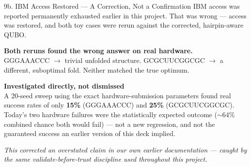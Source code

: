 \documentclass[aspectratio=169,10pt]{beamer}
\begin{document}
\begin{frame}{9b. IBM Access Restored --- A Correction, Not a Confirmation}
  \small IBM access was reported permanently exhausted earlier in this project. That was wrong --- access was restored, and both toy cases were rerun against the corrected, hairpin-aware QUBO.
  \vspace{6pt}
  \begin{redbox}
  \textbf{Both reruns found the wrong answer on real hardware.}\\[4pt]
  \footnotesize GGGAAACCC $\to$ trivial unfolded structure. GCGCUUCGGCGC $\to$ a different, suboptimal fold. Neither matched the true optimum.
  \end{redbox}
  \vspace{8pt}
  \begin{navybox}
  \textbf{\color{accent}Investigated directly, not dismissed}\\[4pt]
  \footnotesize A 20-seed sweep using the exact hardware-submission parameters found real success rates of only \textbf{15\%} (GGGAAACCC) and \textbf{25\%} (GCGCUUCGGCGC). Today's two hardware failures were the statistically expected outcome ($\sim$64\% combined chance both would fail) --- not a new regression, and not the guaranteed success an earlier version of this deck implied.
  \end{navybox}
  \vspace{8pt}
  \small\textit{This corrected an overstated claim in our own earlier documentation --- caught by the same validate-before-trust discipline used throughout this project.}
\end{frame}
\end{document}
